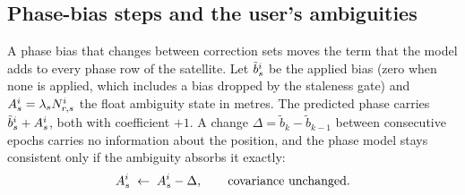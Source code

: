 \documentclass[main.tex]{subfiles}
\begin{document}
\subsection{Phase-bias steps and the user's ambiguities}\label{sec:ssr-pbstep}

A phase bias that changes between correction sets moves the term that the
model adds to every phase row of the satellite. Let $\tilde{b}^i_s$ be
the applied bias (zero when none is applied, which includes a bias dropped by
the staleness gate) and $A^i_s = \lambda_s N^i_{r,s}$ the
float ambiguity state in metres. The predicted phase carries
$\tilde{b}^i_s + A^i_s$, both with coefficient $+1$. A change
$\Delta = \tilde{b}_k - \tilde{b}_{k-1}$ between consecutive epochs carries no
information about the position, and the phase model stays consistent only if
the ambiguity absorbs it exactly:
\begin{equation}
A^i_s \;\leftarrow\; A^i_s - \Delta,
\qquad \text{covariance unchanged.}
\label{eq:ssr-pb-translate}
\end{equation}
\end{document}
